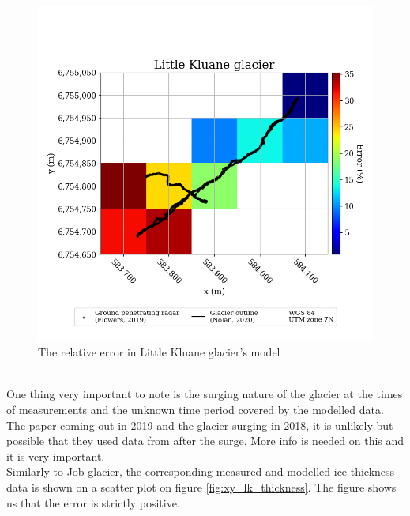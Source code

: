 \documentclass[a4, 12pt]{article}
\begin{document}
\\
\begin{figure}[h!]
\centering
\includegraphics[scale=0.4]{../job_kluane_maps/Little Kluane glacier_rel_error.png}
\caption{The relative error in Little Kluane glacier's model}
\label{fig:rel_error_lk_thickness}
\end{figure}
\\
One thing very important to note is the surging nature of the glacier at the times of measurements and the unknown time period covered by the modelled data. The paper coming out in 2019 and the glacier surging in 2018, it is unlikely but possible that they used data from after the surge. More info is needed on this and it is very important.
\\
Similarly to Job glacier, the corresponding measured and modelled ice thickness data is shown on a scatter plot on figure \ref{fig:xy_lk_thickness}. The figure shows us that the error is strictly positive.
\end{document}
